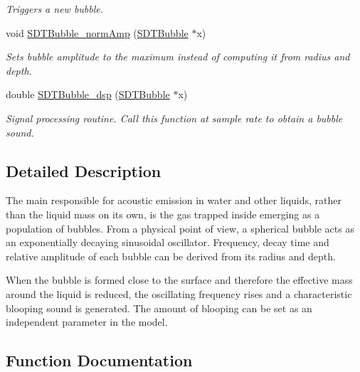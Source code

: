 \begin{DoxyCompactItemize}
\begin{DoxyCompactList}\small\item\em Triggers a new bubble. \end{DoxyCompactList}\item 
\hypertarget{group__bubbles_gaaee6fb3f1576fda28ac548482229fffd}{}void \hyperlink{group__bubbles_gaaee6fb3f1576fda28ac548482229fffd}{S\+D\+T\+Bubble\+\_\+norm\+Amp} (\hyperlink{group__bubbles_ga112f59b24c7a304d0ff6280c98cf7e75}{S\+D\+T\+Bubble} $\ast$x)\label{group__bubbles_gaaee6fb3f1576fda28ac548482229fffd}

\begin{DoxyCompactList}\small\item\em Sets bubble amplitude to the maximum instead of computing it from radius and depth. \end{DoxyCompactList}\item 
double \hyperlink{group__bubbles_ga36550a7621093fddb164de1f68ae6577}{S\+D\+T\+Bubble\+\_\+dsp} (\hyperlink{group__bubbles_ga112f59b24c7a304d0ff6280c98cf7e75}{S\+D\+T\+Bubble} $\ast$x)
\begin{DoxyCompactList}\small\item\em Signal processing routine. Call this function at sample rate to obtain a bubble sound. \end{DoxyCompactList}\end{DoxyCompactItemize}


\subsection{Detailed Description}
The main responsible for acoustic emission in water and other liquids, rather than the liquid mass on its own, is the gas trapped inside emerging as a population of bubbles. From a physical point of view, a spherical bubble acts as an exponentially decaying sinusoidal oscillator. Frequency, decay time and relative amplitude of each bubble can be derived from its radius and depth.

When the bubble is formed close to the surface and therefore the effective mass around the liquid is reduced, the oscillating frequency rises and a characteristic \textquotesingle{}\textquotesingle{}blooping\textquotesingle{}\textquotesingle{} sound is generated. The amount of blooping can be set as an independent parameter in the model. 

\subsection{Function Documentation}
\hypertarget{group__bubbles_ga36550a7621093fddb164de1f68ae6577}{}
